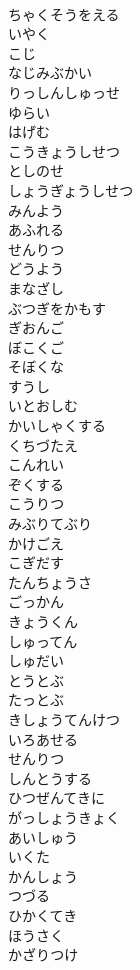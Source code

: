 \documentclass[8pt]{extreport}
\begin{document}
\begin{CJK}{UTF8}{min}
\\	ちゃくそうをえる
\\	いやく
\\	こじ
\\	なじみぶかい
\\	りっしんしゅっせ
\\	ゆらい
\\	はげむ
\\	こうきょうしせつ
\\	としのせ
\\	しょうぎょうしせつ
\\	みんよう
\\	あふれる
\\	せんりつ
\\	どうよう
\\	まなざし
\\	ぶつぎをかもす
\\	ぎおんご
\\	ぼこくご
\\	そぼくな
\\	すうし
\\	いとおしむ
\\	かいしゃくする
\\	くちづたえ
\\	こんれい
\\	ぞくする
\\	こうりつ
\\	みぶりてぶり
\\	かけごえ
\\	こぎだす
\\	たんちょうさ
\\	ごっかん
\\	きょうくん
\\	しゅってん
\\	しゅだい
\\	とうとぶ 
\\	たっとぶ
\\	きしょうてんけつ
\\	いろあせる
\\	せんりつ
\\	しんとうする
\\	ひつぜんてきに
\\	がっしょうきょく
\\	あいしゅう
\\	いくた
\\	かんしょう
\\	つづる
\\	ひかくてき
\\	ほうさく
\\	かざりつけ

\end{CJK}
\end{document}
